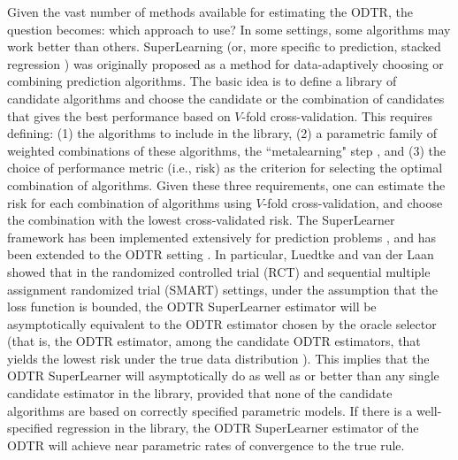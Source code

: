\documentclass[a4paper,12pt]{article}
\begin{document}
Given the vast number of methods available for estimating the ODTR, the question becomes: which approach to use? In some settings, some algorithms may work better than others. SuperLearning \citep{polley2010super} (or, more specific to prediction, stacked regression \citep{breiman1996stacked}) was originally proposed as a method for data-adaptively choosing or combining prediction algorithms. The basic idea is to define a library of candidate algorithms and  choose the candidate or the combination of candidates that gives the best performance based on $V$-fold cross-validation. This requires defining: (1) the algorithms to include in the library, (2) a parametric family of weighted combinations of these algorithms, the “metalearning" step \citep{ledell2016auc}, and (3) the choice of performance metric (i.e., risk) as the criterion for selecting the optimal combination of algorithms. Given these three requirements, one can estimate the risk for each combination of algorithms using $V$-fold cross-validation, and choose the combination with the lowest cross-validated risk. The SuperLearner framework has been implemented extensively for prediction problems \citep{polley2010super, pirracchio2014improving, pirracchio2015mortality, petersen2015super}, and has been extended to the ODTR setting \citep{luedtke2016super, coyle2017computational}. In particular, Luedtke and van der Laan showed that in the randomized controlled trial (RCT) and sequential multiple assignment randomized trial (SMART) \citep{kosorok2015adaptive, almirall2014introduction, lei2012smart} settings, under the assumption that the loss function is bounded, the ODTR SuperLearner estimator will be asymptotically equivalent to the ODTR estimator chosen by the oracle selector (that is, the ODTR estimator, among the candidate ODTR estimators, that yields the lowest risk under the true data distribution \citep{polley2010super}). This implies that the ODTR SuperLearner will asymptotically do as well as or better than any single candidate estimator in the library, provided that none of the candidate algorithms are based on correctly specified parametric models. If there is a well-specified regression in the library, the ODTR SuperLearner estimator of the ODTR will achieve near parametric rates of convergence to the true rule.
\end{document}
